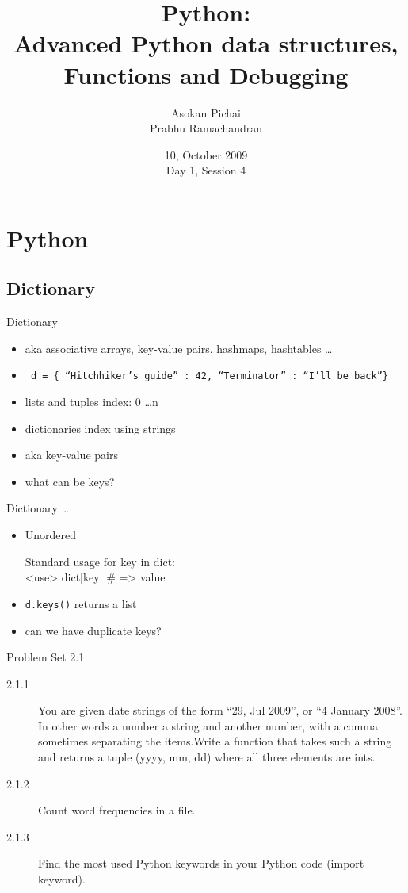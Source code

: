 \documentclass[14pt,compress]{beamer}
\title[Basic Python]{Python:\\Advanced Python data structures, Functions and Debugging}
\author[FOSSEE Team] {Asokan Pichai\\Prabhu Ramachandran}
\institute[IIT Bombay] {Department of Aerospace Engineering\\IIT Bombay}
\date[] {10, October 2009\\Day 1, Session 4}
\newcounter{time}
\newcommand{\inctime}[1]{\addtocounter{time}{#1}{\tiny \thetime\ m}}
\newcommand{\typ}[1]{\texttt{#1}}
\begin{document}
\begin{frame}
  \titlepage
\end{frame}

\section{Python}

\subsection{Dictionary}
\begin{frame}{Dictionary}
  \begin{itemize}
    \item aka associative arrays, key-value pairs, hashmaps, hashtables \ldots    
    \item \typ{ d = \{ ``Hitchhiker's guide'' : 42, ``Terminator'' : ``I'll be back''\}}
    \item lists and tuples index: 0 \ldots n
    \item dictionaries index using strings
    \item aka key-value pairs
    \item what can be keys?
  \end{itemize}
\end{frame}

\begin{frame}{Dictionary \ldots }
  \begin{itemize}
    \item \alert{Unordered}
      \begin{block}{Standard usage}
        for key in dict:\\
            <use> dict[key] \# => value
      \end{block}
    \item \typ{d.keys()} returns a list
    \item can we have duplicate keys?
  \end{itemize}
  \inctime{5}
\end{frame}

\begin{frame} {Problem Set 2.1}
  \begin{description}
\item[2.1.1] You are given date strings of the form ``29, Jul 2009'', or ``4 January 2008''. In other words a number a string and another number, with a comma sometimes separating the items.Write a function that takes such a string and returns a tuple (yyyy, mm, dd) where all three elements are ints.
    \item[2.1.2] Count word frequencies in a file.
    \item[2.1.3] Find the most used Python keywords in your Python code (import keyword).
\end{description}

\inctime{10}
\end{frame}
\end{document}
